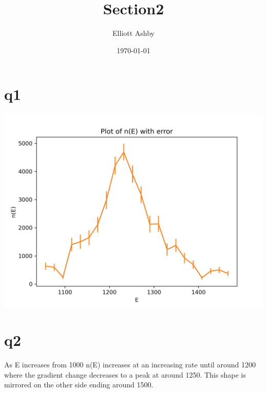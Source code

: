 \documentclass[a4paper,english]{article}
\title{Section2}
\author{Elliott Ashby}
\date{\today}
\begin{document}
    \maketitle
    \section{q1}
        
        \begin{center}
        \includegraphics[scale=0.8]{./2_1.png}
        \end{center}
    \section{q2}
        As E increases from 1000 n(E) increases at an increasing rate
        until around 1200 where the gradient change decreases to a peak at 
        around 1250. This shape is mirrored on the other side ending around
        1500.
\end{document}
